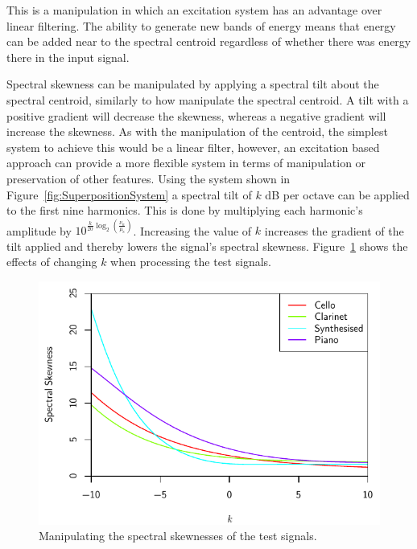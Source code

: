 			This is a manipulation in which an excitation system has an advantage over linear filtering. The
			ability to generate new bands of energy means that energy can be added near to the spectral
			centroid regardless of whether there was energy there in the input signal.

			Spectral skewness can be manipulated by applying a spectral tilt about the spectral centroid,
			similarly to how \citet{williams2007perceptually} manipulate the spectral centroid. A tilt with a
			positive gradient will decrease the skewness, whereas a negative gradient will increase the
			skewness. As with the manipulation of the centroid, the simplest system to achieve this would be a
			linear filter, however, an excitation based approach can provide a more flexible system in terms of
			manipulation or preservation of other features. Using the system shown in
			Figure~\ref{fig:SuperpositionSystem} a spectral tilt of $k$ dB per octave can be applied to the
			first nine harmonics. This is done by multiplying each harmonic's amplitude by
			$10^{\frac{k}{20}\log_{2} \left( \frac{\nu_{n}}{\mu_{\mathrm{s}}} \right)}$. Increasing the value
			of $k$ increases the gradient of the tilt applied and thereby lowers the signal's spectral
			skewness.  Figure~\ref{fig:MoveSkewnesses} shows the effects of changing $k$ when processing the
			test signals.

			\begin{figure}[h!]
				\centering
				\includegraphics{chapter6/Images/MoveSkewnesses.pdf}
				\caption{Manipulating the spectral skewnesses of the test signals.}
				\label{fig:MoveSkewnesses}
			\end{figure}

